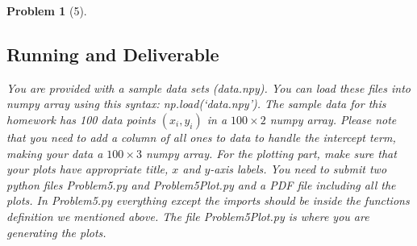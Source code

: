 \documentclass[11pt]{article}
\theoremstyle{quest}
\newtheorem*{problem}{Problem}
\begin{document}
\begin{problem}[5]
\subsection*{Running and Deliverable}
You are provided with a sample data sets (\textsf{data.npy}). You can load these files into \textsf{numpy} array using this syntax: \textsf{np.load(`data.npy')}. The sample data for this homework has 100 data points $(x_i, y_i)$ in a $100 \times 2$ \textsf{numpy} array. Please note that you need to add a column of all ones to data to handle the intercept term, making your data a $100 \times 3$ \textsf{numpy} array. For the plotting part, make sure that your plots have appropriate title, $x$ and $y$-axis labels. You need to submit two python files \textsf{Problem5.py} and \textsf{Problem5Plot.py} and a PDF file including all the plots. In \textsf{Problem5.py} everything except the imports should be inside the functions definition we mentioned above. The file \textsf{Problem5Plot.py} is where you are generating the plots.
\end{problem}
\end{document}
